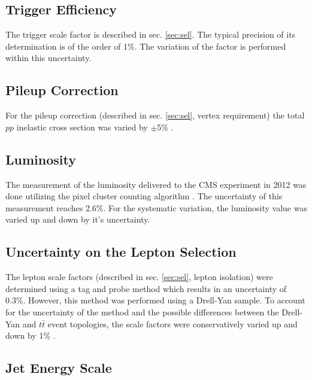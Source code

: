 \subsection{Trigger Efficiency}

The trigger scale factor is described in sec. \ref{sec:sel}. The typical precision of its determination is of the order
of 1\%. The variation of the factor is performed within this uncertainty.

\subsection{Pileup Correction}

For the pileup correction (described in sec. \ref{sec:sel}, vertex requirement) the total $pp$ inelastic cross section was varied by $\pm$5\% \cite{TWikiSystPU}.

\subsection{Luminosity}

The measurement of the luminosity delivered to the CMS experiment in 2012 was done utilizing the pixel cluster counting algorithm \cite{CMS-PAS-LUM-13-001, CMS:2012rua}.
The uncertainty of this measurement reaches 2.6\%\cite{CMS-PAS-LUM-13-001}. For the systematic variation, the luminosity value was varied up and down by it's uncertainty.

\subsection{Uncertainty on the Lepton Selection}

The lepton scale factors (described in sec. \ref{sec:sel}, lepton isolation) were determined using a tag and probe method which results in an uncertainty of 0.3\%\cite{Asin2014Auth}. 
However, this method was performed using a Drell-Yan sample. To account for the uncertainty of the method and the possible differences between the Drell-Yan and $t\bar{t}$ 
event topologies, the scale factors were conservatively varied up and down by 1\% \cite{AN-2012-389}.

\subsection{Jet Energy Scale}

